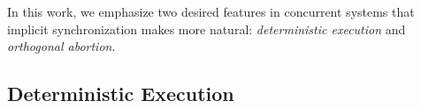 \documentclass{acm_proc_article-sp}
\newcommand{\1}{\;}
\newcommand{\2}{\;\;}
\newcommand{\3}{\;\;\;}
\newcommand{\5}{\;\;\;\;\;}
\begin{document}
In this work, we emphasize two desired features in concurrent systems that 
implicit synchronization makes more natural: \emph{deterministic execution} and 
\emph{orthogonal abortion}.

\subsection{Deterministic Execution}
\end{document}
